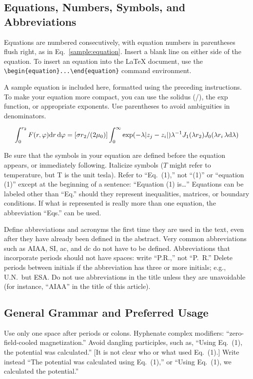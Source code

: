 \documentclass[conf]{new-aiaa}
\begin{document}
\subsection{Equations, Numbers, Symbols, and Abbreviations}
Equations are numbered consecutively, with equation numbers in parentheses flush right, as in Eq.~\eqref{sample:equation}. Insert a blank line on either side of the equation. To insert an equation into the \LaTeX{} document, use the \verb|\begin{equation}...\end{equation}| command environment.

A sample equation is included here, formatted using the preceding instructions. To make your equation more compact, you can use the solidus (/), the exp function, or appropriate exponents. Use parentheses to avoid ambiguities in denominators.

\begin{equation}
\label{sample:equation}
\int^{r_2}_0 F(r,\varphi){\rm d}r\,{\rm d}\varphi = [\sigma r_2/(2\mu_0)]\int^{\infty}_0\exp(-\lambda|z_j-z_i|)\lambda^{-1}J_1 (\lambda r_2)J_0 (\lambda r_i\,\lambda {\rm d}\lambda)
\end{equation}

Be sure that the symbols in your equation are defined before the equation appears, or immediately following. Italicize symbols ($T$ might refer to temperature, but T is the unit tesla). Refer to ``Eq.~(1),'' not ``(1)'' or ``equation (1)'' except at the beginning of a sentence: ``Equation (1) is\ldots'' Equations can be labeled other than ``Eq.'' should they represent inequalities, matrices, or boundary conditions. If what is represented is really more than one equation, the abbreviation ``Eqs.'' can be used.

Define abbreviations and acronyms the first time they are used in the text, even after they have already been defined in the abstract. Very common abbreviations such as AIAA, SI, ac, and dc do not have to be defined. Abbreviations that incorporate periods should not have spaces: write ``P.R.,'' not ``P.~R.'' Delete periods between initials if the abbreviation has three or more initials; e.g., U.N.~but ESA. Do not use abbreviations in the title unless they are unavoidable (for instance, ``AIAA'' in the title of this article).

\subsection{General Grammar and Preferred Usage}
Use only one space after periods or colons. Hyphenate complex modifiers: ``zero-field-cooled magnetization.'' Avoid dangling participles, such as, ``Using Eq.~(1), the potential was calculated.'' [It is not clear who or what used Eq.~(1).] Write instead ``The potential was calculated using Eq.~(1),'' or ``Using Eq.~(1), we calculated the potential.''
\end{document}

